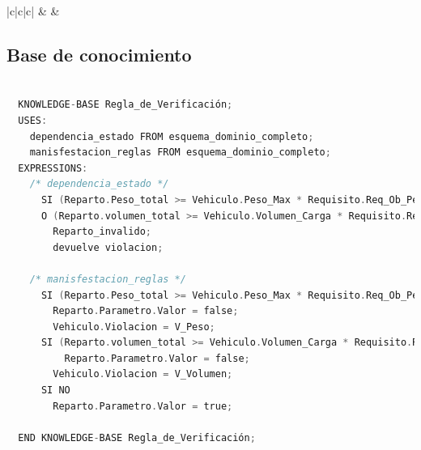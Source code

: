 \begin{table}[H]
{\begin{tabular}{|c|c|c|}
      \hline
      &  & \\
      \hline  
    \end{tabular}
  }
	\caption{\label{tab:EjemploEscenario12}Desglose del funcionamiento del sistema para el escenario 2}
\end{table}

\newpage

\subsection{Base de conocimiento}


\begin{lstlisting}[language=C,caption=\textbf{Regla\_de\_verificación}]

  KNOWLEDGE-BASE Regla_de_Verificación;
  USES:
    dependencia_estado FROM esquema_dominio_completo; 
    manisfestacion_reglas FROM esquema_dominio_completo;
  EXPRESSIONS:
    /* dependencia_estado */
      SI (Reparto.Peso_total >= Vehiculo.Peso_Max * Requisito.Req_Ob_Peso.Peso_value/100) 
      O (Reparto.volumen_total >= Vehiculo.Volumen_Carga * Requisito.Req_Ob_Volumen.Volumen_value/100) CAUSA 
        Reparto_invalido;
        devuelve violacion;
    
    /* manisfestacion_reglas */
      SI (Reparto.Peso_total >= Vehiculo.Peso_Max * Requisito.Req_Ob_Peso.Peso_value/100) TIENE-MANIFESTACION
        Reparto.Parametro.Valor = false;
        Vehiculo.Violacion = V_Peso;
      SI (Reparto.volumen_total >= Vehiculo.Volumen_Carga * Requisito.Req_Ob_Volumen.Volumen_value/100) TIENE-MANIFESTACION
          Reparto.Parametro.Valor = false;
        Vehiculo.Violacion = V_Volumen;
      SI NO 
        Reparto.Parametro.Valor = true;
   
  END KNOWLEDGE-BASE Regla_de_Verificación;
\end{lstlisting}

\newpage    

